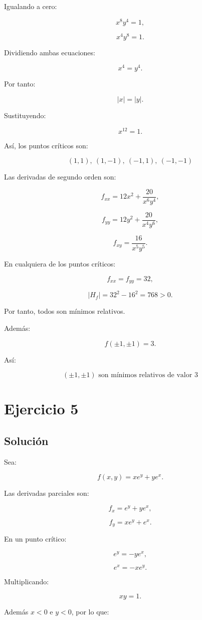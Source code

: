 \documentclass[11pt,a4paper]{article}
\begin{document}
Igualando a cero:

\[
x^8y^4=1,
\]

\[
x^4y^8=1.
\]

Dividiendo ambas ecuaciones:

\[
x^4=y^4.
\]

Por tanto:

\[
|x|=|y|.
\]

Sustituyendo:

\[
x^{12}=1.
\]

Así, los puntos críticos son:

\[
\boxed{
(1,1),\ (1,-1),\ (-1,1),\ (-1,-1)
}
\]

Las derivadas de segundo orden son:

\[
f_{xx}
=
12x^2+\frac{20}{x^6y^4},
\]

\[
f_{yy}
=
12y^2+\frac{20}{x^4y^6},
\]

\[
f_{xy}
=
\frac{16}{x^5y^5}.
\]

En cualquiera de los puntos críticos:

\[
f_{xx}=f_{yy}=32,
\]

\[
|H_f|
=
32^2-16^2
=
768>0.
\]

Por tanto, todos son mínimos relativos.

Además:

\[
f(\pm1,\pm1)=3.
\]

Así:

\[
\boxed{
(\pm1,\pm1)\text{ son mínimos relativos de valor }3
}
\]

\section{Ejercicio 5}
\subsection{Solución}

Sea:

\[
f(x,y)
=
xe^y+ye^x.
\]

Las derivadas parciales son:

\[
f_x=e^y+ye^x,
\]

\[
f_y=xe^y+e^x.
\]

En un punto crítico:

\[
e^y=-ye^x,
\]

\[
e^x=-xe^y.
\]

Multiplicando:

\[
xy=1.
\]

Además \(x<0\) e \(y<0\), por lo que:
\end{document}
